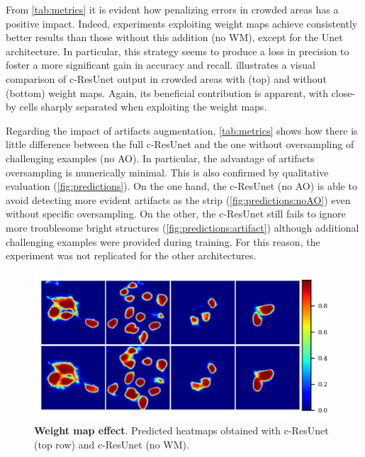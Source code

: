 From \cref{tab:metrics} it is evident how penalizing errors in crowded areas has a positive impact. Indeed, experiments exploiting weight maps achieve consistently better results than those without this addition (no WM), except for the Unet architecture.  
In particular, this strategy seems to produce a loss in precision to foster a more significant gain in accuracy and recall.
 illustrates a visual comparison of c-ResUnet output in crowded areas with (top) and without (bottom) weight maps. 
Again, its beneficial contribution is apparent, with close-by cells sharply separated when exploiting the weight maps.

Regarding the impact of artifacts augmentation, \cref{tab:metrics} shows how there is little difference between the full c-ResUnet and the one without oversampling of challenging examples (no AO).
In particular, the advantage of artifacts oversampling is numerically minimal.
This is also confirmed by qualitative evaluation (\cref{fig:predictions}).
On the one hand, the c-ResUnet (no AO) is able to avoid detecting more evident artifacts as the strip (\cref{fig:predictions:noAO}) even without specific oversampling.
On the other, the c-ResUnet  still fails to ignore more troublesome bright structures (\cref{fig:predictions:artifact}) although additional challenging examples were provided during training.
For this reason, the experiment was not replicated for the other architectures. 
\begin{figure}
\centering
\includegraphics[width=\textwidth]{figures/130_methods/weigths_effect.png}
\caption{\textbf{Weight map effect}. 
Predicted heatmaps obtained with c-ResUnet (top row) and c-ResUnet (no WM).} 
\label{fig:weigths_effect}
\end{figure}
